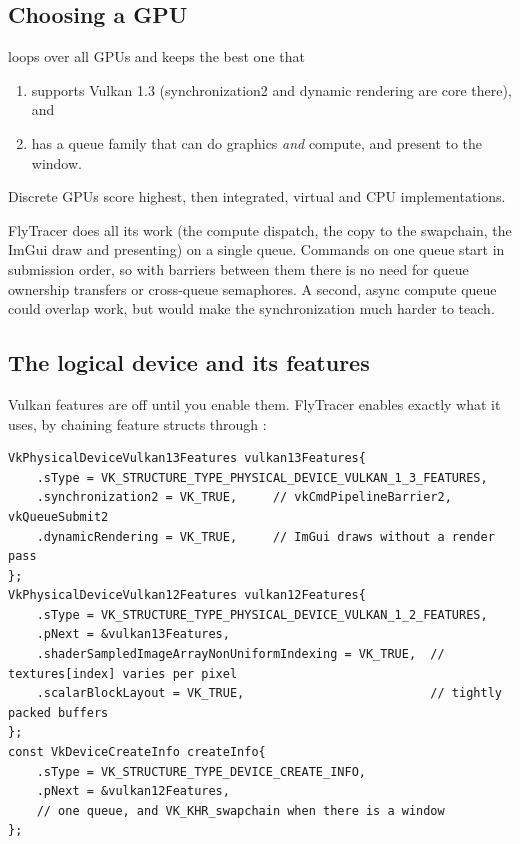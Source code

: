 \documentclass[11pt,a4paper]{article}
\begin{document}
\subsection{Choosing a GPU}

 loops over all GPUs and keeps the best one that
\begin{enumerate}
  \item supports Vulkan 1.3 (synchronization2 and dynamic rendering are core there), and
  \item has a queue family that can do graphics \emph{and} compute, and present to the window.
\end{enumerate}
Discrete GPUs score highest, then integrated, virtual and CPU implementations.

\begin{keyidea}
FlyTracer does all its work (the compute dispatch, the copy to the swapchain, the ImGui draw and presenting) on a single queue. Commands on one queue start in submission order, so with barriers between them there is no need for queue ownership transfers or cross-queue semaphores. A second, async compute queue could overlap work, but would make the synchronization much harder to teach.
\end{keyidea}

\subsection{The logical device and its features}

Vulkan features are off until you enable them. FlyTracer enables exactly what it uses, by chaining feature structs through :

\begin{lstlisting}
VkPhysicalDeviceVulkan13Features vulkan13Features{
    .sType = VK_STRUCTURE_TYPE_PHYSICAL_DEVICE_VULKAN_1_3_FEATURES,
    .synchronization2 = VK_TRUE,     // vkCmdPipelineBarrier2, vkQueueSubmit2
    .dynamicRendering = VK_TRUE,     // ImGui draws without a render pass
};
VkPhysicalDeviceVulkan12Features vulkan12Features{
    .sType = VK_STRUCTURE_TYPE_PHYSICAL_DEVICE_VULKAN_1_2_FEATURES,
    .pNext = &vulkan13Features,
    .shaderSampledImageArrayNonUniformIndexing = VK_TRUE,  // textures[index] varies per pixel
    .scalarBlockLayout = VK_TRUE,                          // tightly packed buffers
};
const VkDeviceCreateInfo createInfo{
    .sType = VK_STRUCTURE_TYPE_DEVICE_CREATE_INFO,
    .pNext = &vulkan12Features,
    // one queue, and VK_KHR_swapchain when there is a window
};
\end{lstlisting}
\end{document}
